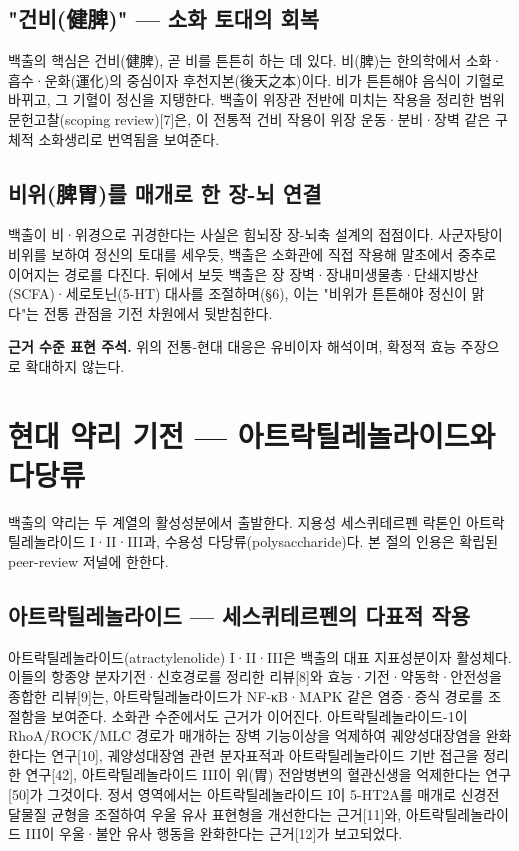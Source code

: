\documentclass[12pt,oneside]{book}
\newenvironment{authnote}
  {\par\smallskip\begingroup\leftskip=6mm\rightskip=3mm\small\color{muted}\noindent\ignorespaces}
  {\par\endgroup\smallskip}
\begin{document}
\subsection{"건비(健脾)" — 소화 토대의 회복}

백출의 핵심은 건비(健脾), 곧 비를 튼튼히 하는 데 있다. 비(脾)는 한의학에서 소화·흡수·운화(運化)의 중심이자 후천지본(後天之本)이다. 비가 튼튼해야 음식이 기혈로 바뀌고, 그 기혈이 정신을 지탱한다. 백출이 위장관 전반에 미치는 작용을 정리한 범위 문헌고찰(scoping review)[7]은, 이 전통적 건비 작용이 위장 운동·분비·장벽 같은 구체적 소화생리로 번역됨을 보여준다.

\subsection{비위(脾胃)를 매개로 한 장-뇌 연결}

백출이 비·위경으로 귀경한다는 사실은 힘뇌장 장-뇌축 설계의 접점이다. 사군자탕이 비위를 보하여 정신의 토대를 세우듯, 백출은 소화관에 직접 작용해 말초에서 중추로 이어지는 경로를 다진다. 뒤에서 보듯 백출은 장 장벽·장내미생물총·단쇄지방산(SCFA)·세로토닌(5-HT) 대사를 조절하며(§6), 이는 "비위가 튼튼해야 정신이 맑다"는 전통 관점을 기전 차원에서 뒷받침한다.

\begin{authnote}\textbf{근거 수준 표현 주석.} 위의 전통-현대 대응은 유비이자 해석이며, 확정적 효능 주장으로 확대하지 않는다.\end{authnote}

\section{현대 약리 기전 — 아트락틸레놀라이드와 다당류}

백출의 약리는 두 계열의 활성성분에서 출발한다. 지용성 세스퀴테르펜 락톤인 아트락틸레놀라이드 I·II·III과, 수용성 다당류(polysaccharide)다. 본 절의 인용은 확립된 peer-review 저널에 한한다.

\subsection{아트락틸레놀라이드 — 세스퀴테르펜의 다표적 작용}

아트락틸레놀라이드(atractylenolide) I·II·III은 백출의 대표 지표성분이자 활성체다. 이들의 항종양 분자기전·신호경로를 정리한 리뷰[8]와 효능·기전·약동학·안전성을 종합한 리뷰[9]는, 아트락틸레놀라이드가 NF-κB·MAPK 같은 염증·증식 경로를 조절함을 보여준다. 소화관 수준에서도 근거가 이어진다. 아트락틸레놀라이드-1이 RhoA/ROCK/MLC 경로가 매개하는 장벽 기능이상을 억제하여 궤양성대장염을 완화한다는 연구[10], 궤양성대장염 관련 분자표적과 아트락틸레놀라이드 기반 접근을 정리한 연구[42], 아트락틸레놀라이드 III이 위(胃) 전암병변의 혈관신생을 억제한다는 연구[50]가 그것이다. 정서 영역에서는 아트락틸레놀라이드 I이 5-HT2A를 매개로 신경전달물질 균형을 조절하여 우울 유사 표현형을 개선한다는 근거[11]와, 아트락틸레놀라이드 III이 우울·불안 유사 행동을 완화한다는 근거[12]가 보고되었다.
\end{document}

